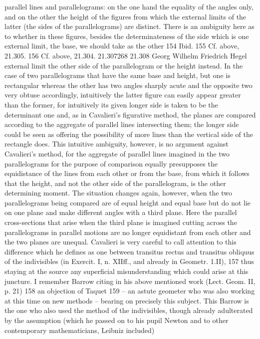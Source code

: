 parallel lines and parallelograms: on the one hand the equality of the angles
only, and on the other the height of the figures from which the external
limits of the latter (the sides of the parallelograms) are distinct. There is an
ambiguity here as to whether in these figures, besides the determinateness
of the side which is one external limit, the base, we should take as the other
154
Ibid.
155
Cf. above, 21.305.
156
Cf. above, 21.304.
21.307268
21.308
Georg Wilhelm Friedrich Hegel
external limit the other side of the parallelogram or the height instead. In
the case of two parallelograms that have the same base and height, but
one is rectangular whereas the other has two angles sharply acute and the
opposite two very obtuse accordingly, intuitively the latter figure can easily
appear greater than the former, for intuitively its given longer side is taken
to be the determinant one and, as in Cavalieri’s figurative method, the planes
are compared according to the aggregate of parallel lines intersecting them;
the longer side could be seen as offering the possibility of more lines than
the vertical side of the rectangle does. This intuitive ambiguity, however,
is no argument against Cavalieri’s method, for the aggregate of parallel
lines imagined in the two parallelograms for the purpose of comparison
equally presupposes the equidistance of the lines from each other or from
the base, from which it follows that the height, and not the other side of
the parallelogram, is the other determining moment. The situation changes
again, however, when the two parallelograms being compared are of equal
height and equal base but do not lie on one plane and make different angles
with a third plane. Here the parallel cross-sections that arise when the third
plane is imagined cutting across the parallelograms in parallel motions are
no longer equidistant from each other and the two planes are unequal.
Cavalieri is very careful to call attention to this difference which he defines
as one between transitus rectus and transitus obliquus of the indivisibles (in
Exercit. I, n. XIIff., and already in Geometr. 1.II), 157 thus staying at the
source any superficial misunderstanding which could arise at this juncture.
I remember Barrow citing in his above mentioned work (Lect. Geom. II,
p. 21) 158 an objection of Taquet 159 – an astute geometer who was also
working at this time on new methods – bearing on precisely this subject.
This Barrow is the one who also used the method of the indivisibles, though
already adulterated by the assumption (which he passed on to his pupil
Newton and to other contemporary mathematicians, Leibniz included)
